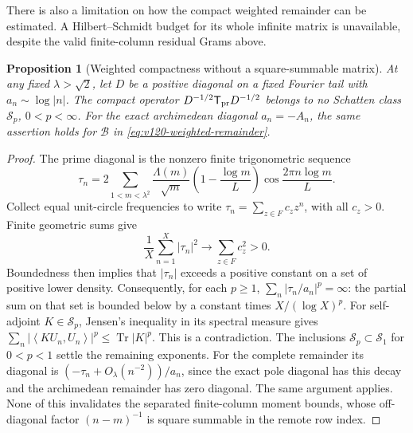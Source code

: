 \documentclass[11pt]{article}
\newtheorem{proposition}[theorem]{Proposition}
\theoremstyle{remark}
\newcommand{\ip}[2]{\left\langle #1,#2\right\rangle}
\begin{document}
There is also a limitation on how the compact weighted remainder can
be estimated. A Hilbert--Schmidt budget for its whole infinite matrix
is unavailable, despite the valid finite-column residual Grams above.

\begin{proposition}[Weighted compactness without a square-summable matrix]
\label{prop:v120-not-schatten}
At any fixed $\lambda>\sqrt2$, let $D$ be a positive diagonal on a
fixed Fourier tail with $a_n\sim\log|n|$. The compact operator
$D^{-1/2}\mathsf T_{\rm pr}D^{-1/2}$ belongs to no Schatten class
$\mathcal S_p$, $0<p<\infty$. For the exact archimedean diagonal
$a_n=-A_n$, the same assertion holds for
$\mathcal B$ in \eqref{eq:v120-weighted-remainder}.
\end{proposition}
\begin{proof}
The prime diagonal is the nonzero finite trigonometric sequence
\[
 \tau_n=2\sum_{1<m<\lambda^2}
 \frac{\Lambda(m)}{\sqrt m}
 \left(1-\frac{\log m}{L}\right)
 \cos\frac{2\pi n\log m}{L}.
\]
Collect equal unit-circle frequencies to write
$\tau_n=\sum_{z\in F}c_z z^n$, with all $c_z>0$.
Finite geometric sums give
\[
 \frac1X\sum_{n=1}^X|\tau_n|^2\longrightarrow
 \sum_{z\in F}c_z^2>0.
\]
Boundedness then implies that $|\tau_n|$ exceeds a positive
constant on a set of positive lower density. Consequently, for each
$p\ge1$, $\sum_n|\tau_n/a_n|^p=\infty$: the partial sum on
that set is bounded below by a constant times $X/(\log X)^p$.
For self-adjoint $K\in\mathcal S_p$, Jensen's inequality in its
spectral measure gives
$\sum_n|\ip{KU_n}{U_n}|^p\le\operatorname{Tr}|K|^p$.
This is a contradiction. The inclusions
$\mathcal S_p\subset\mathcal S_1$ for $0<p<1$ settle the
remaining exponents. For the complete remainder its diagonal is
$(-\tau_n+O_\lambda(n^{-2}))/a_n$, since the exact pole diagonal
has this decay and the archimedean remainder has zero diagonal.
The same argument applies. None of this invalidates the separated
finite-column moment bounds, whose off-diagonal factor
$(n-m)^{-1}$ is square summable in the remote row index.
\end{proof}
\end{document}
